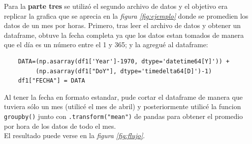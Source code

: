 \documentclass[12pt]{article}
\begin{document}
Para la \textbf{parte tres} se utiliz\'o el segundo archivo de datos y el objetivo era replicar la grafica que se aprecia en la \textit{figura \ref{fig:ejemplo}} donde se promedien los datos de un mes por horas. Primero, tras leer el archivo de datos y obtener un dataframe, obtuve la fecha completa ya que los datos estan tomados de manera que el d\'ia es un n\'umero entre el 1 y 365; y la agregu\'e al dataframe:
\begin{verbatim}
    DATA=(np.asarray(df1['Year']-1970, dtype='datetime64[Y]')) + 
         (np.asarray(df1["DoY"], dtype='timedelta64[D]')-1)
    df1["FECHA"] = DATA
\end{verbatim}
Al tener la fecha en formato estandar, pude cortar el dataframe de manera que tuviera s\'olo un mes (utilic\'e el mes de abril) y posteriormente utilic\'e la funcion \texttt{groupby()} junto con \texttt{.transform("mean")} de pandas para obtener el promedio por hora de los datos de todo el mes.\\
El resultado puede verse en la \textit{figura \ref{fig:flujo}}.
\end{document}
